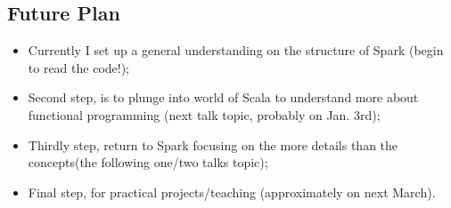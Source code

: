 \documentclass[notheorems, aspectratio=54]{beamer}
\begin{document}
\subsection{Future Plan}
\begin{frame}


 \begin{itemize}
 \item Currently I set up a general understanding on the structure of Spark (begin to read the code!); 
 \item Second step, is to plunge into world of Scala to understand more about functional programming (next talk topic, probably on Jan. 3rd);
 \item Thirdly step, return to Spark focusing on the more details than the concepts(the following one/two talks topic);
 \item Final step, for practical projects/teaching (approximately on next March).
\end{itemize}

\end{frame}
\end{document}
